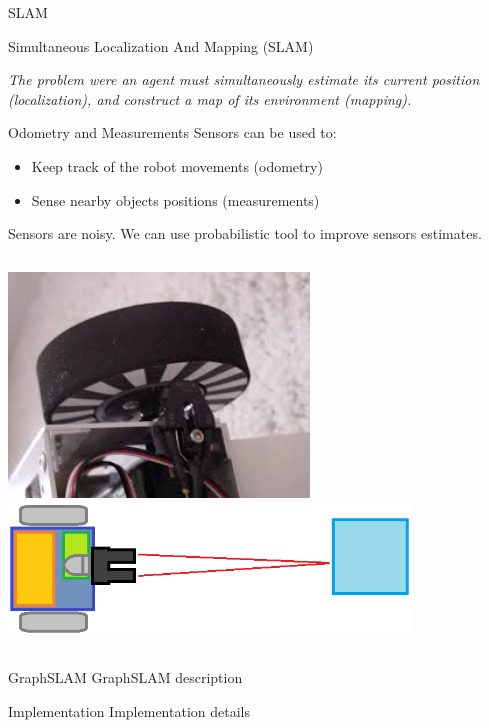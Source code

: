 \documentclass{beamer}
\begin{document}
\begin{frame}{SLAM}
\begin{block}{Simultaneous Localization And Mapping (SLAM)}
\begin{center}
\textit{
The problem were an agent must simultaneously estimate its current position (localization), and construct a map of its environment (mapping).}
\end{center}
\end{block}
\begin{block}{Odometry and Measurements}
Sensors can be used to:
\begin{itemize}
\item Keep track of the robot movements (odometry)
\item Sense nearby objects positions (measurements)
\end{itemize}
Sensors are noisy. We can use probabilistic tool to improve sensors estimates.
\end{block}
\begin{columns}
\includegraphics[width=0.6\textwidth]{img/encoders.jpg}
\centering
{}
\centering
\includegraphics[width=0.8\textwidth]{img/laser.png}
\end{columns}
\end{frame}

\begin{frame}{GraphSLAM}
GraphSLAM description
\end{frame}

\begin{frame}{Implementation}
Implementation details
\end{frame}
\end{document}
